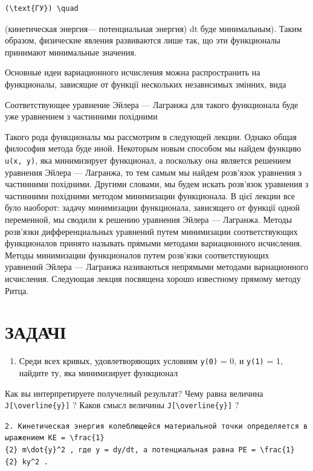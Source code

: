 \documentclass[
  ukrainian,
]{article}
\providecommand{\tightlist}{%
  \setlength{\itemsep}{0pt}\setlength{\parskip}{0pt}}
\begin{document}
\begin{verbatim}
(\text{ГУ}) \quad
\end{verbatim}

(кинетическая энергия--- потенциальная энергия) dt буде минимальным).
Таким образом, физические явления развиваются лише так, що эти
функционалы принимают минимальные значения.

Основные идеи вариационного исчисления можна распространить на
функционалы, зависящие от функції нескольких независимых змінних, вида

Соответствующее уравнение Эйлера --- Лагранжа для такого функционала
буде уже уравнением з частинними похідними

Такого рода функционалы мы рассмотрим в следующей лекции. Однако общая
философия метода буде иной. Некоторым новым способом мы найдем функцию
\texttt{u(x,\ y)}, яка минимизирует функционал, а поскольку она является
решением уравнения Эйлера --- Лагранжа, то тем самым мы найдем розв'язок
уравнения з частинними похідними. Другими словами, мы будем искать
розв'язок уравнения з частинними похідними методом минимизации
функционала. В цієї лекции все було наоборот: задачу минимизации
функционала, зависящего от функції одной переменной, мы сводили к
решению уравнения Эйлера --- Лагранжа. Методы розв'язки дифференциальных
уравнений путем минимизации соответствующих функционалов принято
называть прямыми методами вариационного исчисления. Методы минимизации
функционалов путем розв'язки соответствующих уравнений Эйлера ---
Лагранжа називаються непрямыми методами вариационного исчисления.
Следующая лекция посвящена хорошо известному прямому методу Ритца.

\section{ЗАДАЧІ}\label{ux437ux430ux434ux430ux447ux456}

\begin{enumerate}
\def\labelenumi{\arabic{enumi}.}
\tightlist
\item
  Среди всех кривых, удовлетворяющих условиям \texttt{y(0)} = 0, и
  \texttt{y(1)} = 1, найдите ту, яка минимизирует функционал
\end{enumerate}

Как вы интерпретируете получелный результат? Чему равна величина
\texttt{J{[}\textbackslash{}overline\{y\}{]}} ? Каков смысл величины
\texttt{J{[}\textbackslash{}overline\{y\}{]}} ?

\texttt{2.\ Кинетическая\ энергия\ колеблющейся\ материальной\ точки\ определяется\ выражением\ \textquotesingle{}KE\ =\ \textbackslash{}frac\{1\}\{2\}\ m\textbackslash{}dot\{y\}\^{}2\textquotesingle{}\ ,\ где\ y\ =\ dy/dt,\ а\ потенциальная\ равна\ \textquotesingle{}PE\ =\ \textbackslash{}frac\{1\}\{2\}\ ky\^{}2\textquotesingle{}\ .}
\end{document}
